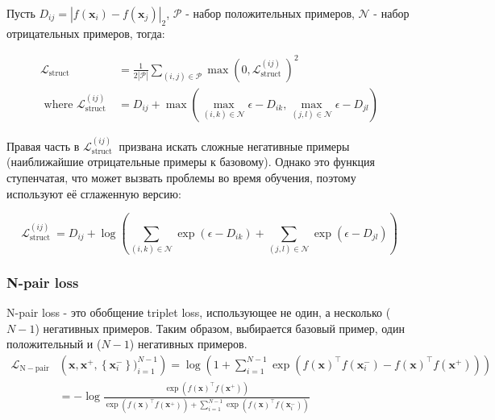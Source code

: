 Пусть $D_{i j}=\left|f\left(\mathbf{x}_i\right)-f\left(\mathbf{x}_j\right)\right|_2$, $\mathcal{P}$ - набор положительных примеров, $\mathcal{N}$ - набор отрицательных примеров, тогда:

$$
\begin{aligned}
\mathcal{L}_{\text {struct }} & =\frac{1}{2|\mathcal{P}|} \sum_{(i, j) \in \mathcal{P}} \max \left(0, \mathcal{L}_{\text {struct }}^{(i j)}\right)^2 \\
\text { where } \mathcal{L}_{\text {struct }}^{(i j)} & =D_{i j}+\max \left(\max _{(i, k) \in \mathcal{N}} \epsilon-D_{i k}, \max _{(j, l) \in \mathcal{N}} \epsilon-D_{j l}\right)
\end{aligned}
$$

Правая часть в $\mathcal{L}_{\text {struct }}^{(i j)}$ призвана искать сложные негативные примеры (наиближайшие отрицательные примеры к базовому). Однако это функция ступенчатая, что может вызвать проблемы во время обучения, поэтому используют её сглаженную версию:

$$
\mathcal{L}_{\text {struct }}^{(i j)}=D_{i j}+\log \left(\sum_{(i, k) \in \mathcal{N}} \exp \left(\epsilon-D_{i k}\right)+\sum_{(j, l) \in \mathcal{N}} \exp \left(\epsilon-D_{j l}\right)\right)
$$

\subsubsection{N-pair loss}

N-pair loss \cite{LossNpair} -  это обобщение triplet loss, использующее не один, а несколько ($N-1$) негативных примеров. Таким образом, выбирается базовый пример, один положительный и ($N-1$) негативных примеров.
$$
\begin{aligned}
\mathcal{L}_{\mathrm{N}-\mathrm{pair}}&\left(\mathbf{x}, \mathbf{x}^{+},\left\{\mathbf{x}_i^{-}\right\})_{i=1}^{N-1}\right)  =\log \left(1+\sum_{i=1}^{N-1} \exp \left(f(\mathbf{x})^{\top} f\left(\mathbf{x}_i^{-}\right)-f(\mathbf{x})^{\top} f\left(\mathbf{x}^{+}\right)\right)\right) \\
& =-\log \frac{\exp \left(f(\mathbf{x})^{\top} f\left(\mathbf{x}^{+}\right)\right)}{\exp \left(f(\mathbf{x})^{\top} f\left(\mathbf{x}^{+}\right)\right)+\sum_{i=1}^{N-1} \exp \left(f(\mathbf{x})^{\top} f\left(\mathbf{x}_i^{-}\right)\right)}
\end{aligned}
$$

